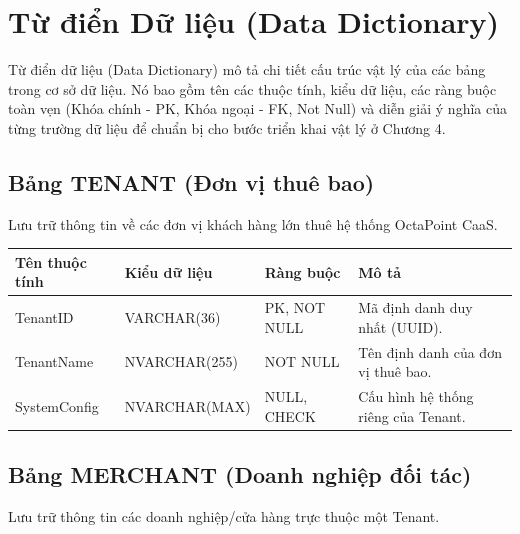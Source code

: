 \section{Từ điển Dữ liệu (Data Dictionary)}

Từ điển dữ liệu (Data Dictionary) mô tả chi tiết cấu trúc vật lý của các bảng trong cơ sở dữ liệu. Nó bao gồm tên các thuộc tính, kiểu dữ liệu, các ràng buộc toàn vẹn (Khóa chính - PK, Khóa ngoại - FK, Not Null) và diễn giải ý nghĩa của từng trường dữ liệu để chuẩn bị cho bước triển khai vật lý ở Chương 4.

\subsection{Bảng TENANT (Đơn vị thuê bao)}
Lưu trữ thông tin về các đơn vị khách hàng lớn thuê hệ thống OctaPoint CaaS.

\begin{table}[H]
    \centering
    \renewcommand{\arraystretch}{1.3}
    \begin{tabular}{|>{\raggedright\arraybackslash}p{3cm}|>{\raggedright\arraybackslash}p{3.2cm}|>{\raggedright\arraybackslash}p{2.5cm}|>{\raggedright\arraybackslash}p{5.5cm}|}
        \hline
        \textbf{Tên thuộc tính} & \textbf{Kiểu dữ liệu} & \textbf{Ràng buộc} & \textbf{Mô tả} \\ \hline
        TenantID & VARCHAR(36) & PK, NOT NULL & Mã định danh duy nhất (UUID). \\ \hline
        TenantName & NVARCHAR(255) & NOT NULL & Tên định danh của đơn vị thuê bao. \\ \hline
        SystemConfig & NVARCHAR(MAX) & NULL, CHECK & Cấu hình hệ thống riêng của Tenant. \\ \hline
    \end{tabular}
\end{table}

\subsection{Bảng MERCHANT (Doanh nghiệp đối tác)}
Lưu trữ thông tin các doanh nghiệp/cửa hàng trực thuộc một Tenant.

